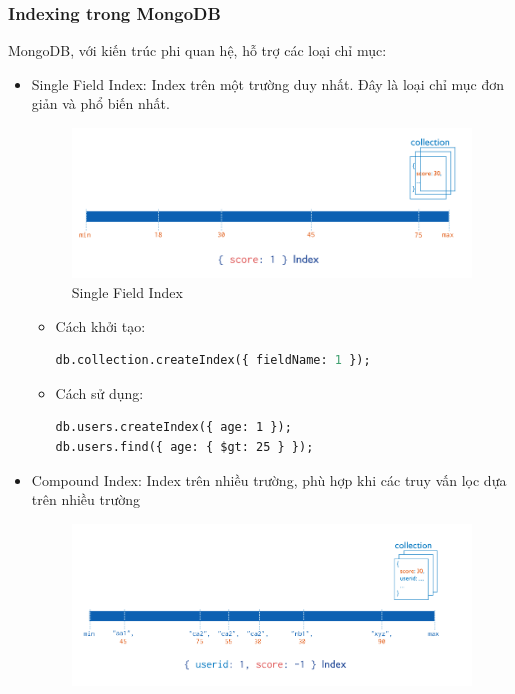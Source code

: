 \subsubsection{Indexing trong MongoDB}
\indent MongoDB, với kiến trúc phi quan hệ, hỗ trợ các loại chỉ mục:
\begin{itemize}
    \item Single Field Index: Index trên một trường duy nhất. Đây là loại chỉ mục đơn giản và phổ biến nhất.
    \begin{figure}[H]
        \centering
        \includegraphics[width=\textwidth]{Image/2.2.3a.png}
        \caption{Single Field Index}
    \end{figure}
        \begin{itemize}
            \item Cách khởi tạo:
\begin{lstlisting}[language=SQL]
db.collection.createIndex({ fieldName: 1 }); 
\end{lstlisting}
            \item Cách sử dụng:
\begin{lstlisting}[language=inform]
db.users.createIndex({ age: 1 });
db.users.find({ age: { $gt: 25 } });
\end{lstlisting}
        \end{itemize}
    \item Compound Index: Index trên nhiều trường, phù hợp khi các truy vấn lọc dựa trên nhiều trường
    \begin{figure}[H]
        \centering
        \includegraphics[width=\textwidth]{Image/2.2.3b.png}

\end{figure}
\end{itemize}
